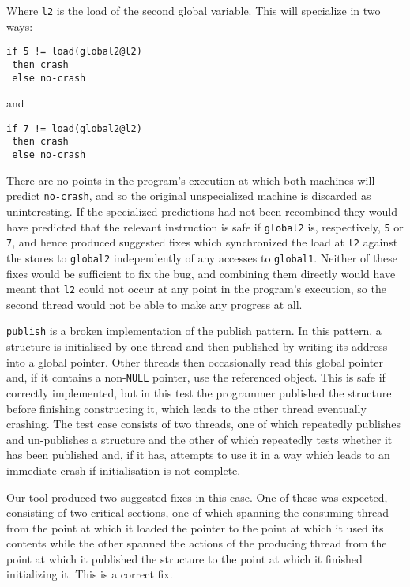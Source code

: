 \documentclass[10pt,twocolumn,preprint,natbib,authoryear]{sigplanconf}
\newcommand{\editorial}[1]{}
\begin{document}
Where \verb|l2| is the load of the second global variable.  This
will specialize in two ways:

\begin{verbatim}
if 5 != load(global2@l2)
 then crash
 else no-crash
\end{verbatim}

and

\begin{verbatim}
if 7 != load(global2@l2)
 then crash
 else no-crash
\end{verbatim}

There are no points in the program's execution at which both machines
will predict \verb|no-crash|, and so the original unspecialized
machine is discarded as uninteresting.  If the specialized predictions
had not been recombined they would have predicted that the relevant
instruction is safe if \verb|global2| is, respectively, \verb|5| or
\verb|7|, and hence produced suggested fixes which synchronized the
load at \verb|l2| against the stores to \verb|global2| independently
of any accesses to \verb|global1|.  Neither of these fixes would be
sufficient to fix the bug, and combining them directly would have
meant that \verb|l2| could not occur at any point in the program's
execution, so the second thread would not be able to make any progress
at all.

\verb|publish| is a broken implementation of the publish pattern.  In
this pattern, a structure is initialised by one thread and then
published by writing its address into a global pointer.  Other threads
then occasionally read this global pointer and, if it contains a
non-\verb|NULL| pointer, use the referenced object.\editorial{I'm
  convinced that this is a standard pattern, and that I didn't invent
  the term, but I can't find a reference.}  This is safe if correctly
implemented, but in this test the programmer published the structure
before finishing constructing it, which leads to the other thread
eventually crashing.  The test case consists of two threads, one of
which repeatedly publishes and un-publishes a structure and the other
of which repeatedly tests whether it has been published and, if it
has, attempts to use it in a way which leads to an immediate crash if
initialisation is not complete.

Our tool produced two suggested fixes in this case.  One of these was
expected, consisting of two critical sections, one of which spanning
the consuming thread from the point at which it loaded the pointer to
the point at which it used its contents while the other spanned the
actions of the producing thread from the point at which it published
the structure to the point at which it finished initializing it.  This
is a correct fix.
\end{document}
